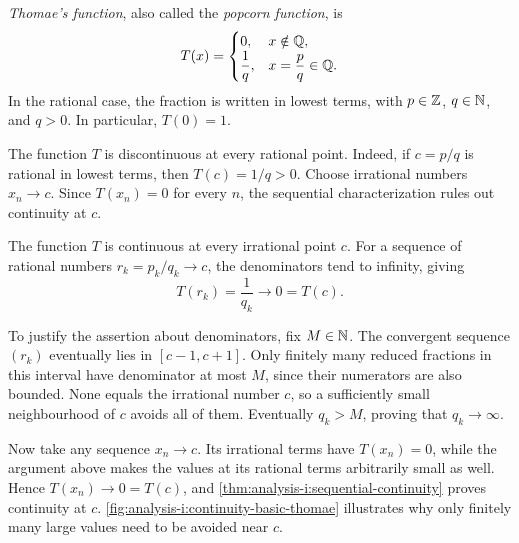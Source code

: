 \begin{example}

  \label{thm:analysis-i:thomae-function}
  \emph{Thomae's function}, also called the \emph{popcorn function}, is
  \[
    T(x)=
    \begin{cases}
      0,&x\notin\mathbb{Q},\\
      \dfrac1q,&x=\dfrac pq\in\mathbb{Q}.
    \end{cases}
  \]
  In the rational case, the fraction is written in
  lowest terms, with $p\in\mathbb{Z}$, $q\in\mathbb{N}$, and $q>0$.
  In particular, $T(0)=1$.

  The function $T$ is discontinuous at every rational point.
  Indeed, if $c=p/q$ is rational in lowest terms,
  then $T(c)=1/q>0$. Choose irrational numbers $x_n\to c$.
  Since $T(x_n)=0$ for every $n$, the sequential characterization
  rules out continuity at $c$.

  The function $T$ is continuous at every irrational point $c$.
  For a sequence of rational numbers $r_k=p_k/q_k\to c$, the denominators
  tend to infinity, giving
  \[
    T(r_k)=\frac1{q_k}\longrightarrow0=T(c).
  \]


  To justify the assertion about denominators, fix $M\in\mathbb{N}$.
  The convergent sequence $(r_k)$ eventually lies in $[c-1,c+1]$.
  Only finitely many reduced fractions in this interval have denominator
  at most $M$, since their numerators are also bounded. None equals the
  irrational number $c$, so a sufficiently small neighbourhood of $c$
  avoids all of them. Eventually $q_k>M$, proving that $q_k\to\infty$.

  Now take any sequence $x_n\to c$. Its irrational terms have
  $T(x_n)=0$, while the argument above makes the values at its rational
  terms arbitrarily small as well. Hence $T(x_n)\to0=T(c)$, and
  \autoref{thm:analysis-i:sequential-continuity} proves continuity at $c$.
  \autoref{fig:analysis-i:continuity-basic-thomae} illustrates why only
  finitely many large values need to be avoided near $c$.

\end{example}

